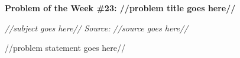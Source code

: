 \begin{potw}\vspace{5pt}
{\large\textbf{Problem of the Week \#23: //problem title goes here//}}\vspace{5pt}

\textit{//subject goes here//}\newline
\textit{Source: //source goes here//}\V

//problem statement goes here//
\end{potw}\V

